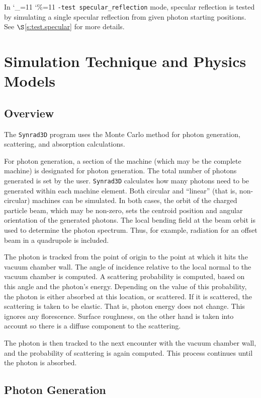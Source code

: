 \documentclass[11pt]{article}
\newcommand{\sref}[1]{$\S$\ref{#1}}
\newcommand{\srthree}{\texttt{Synrad3D}\xspace}
\newcommand\ttcmd{\begingroup\catcode`\_=11 \catcode`\%=11 \dottcmd}
\newcommand\dottcmd[1]{\texttt{#1}\endgroup}
\newcommand{\vn}{\ttcmd}
\begin{document}
In \vn{-test specular_reflection} mode, specular reflection is tested
by simulating a single specular reflection from given photon
starting positions. See \sref{s:test.specular} for more details.

\section{Simulation Technique and Physics Models}
\subsection{Overview} 

The \srthree program uses the Monte Carlo method for photon
generation, scattering, and absorption calculations.

For photon generation, a section of the machine (which may be the
complete machine) is designated for photon generation.  The total
number of photons generated is set by the user. \srthree calculates
how many photons need to be generated within each machine
element. Both circular and ``linear'' (that is, non-circular) machines
can be simulated.  In both cases, the orbit of the charged particle
beam, which may be non-zero, sets the centroid position and angular
orientation of the generated photons. The local bending field at the
beam orbit is used to determine the photon spectrum. Thus, for
example, radiation for an offset beam in a quadrupole is included.

The photon is tracked from the point of origin to
the point at which it hits the vacuum chamber wall. The angle of
incidence relative to the local normal to the vacuum chamber is
computed. A scattering probability is computed, based on this angle
and the photon's energy. Depending on the value of this probability,
the photon is either absorbed at this location, or scattered. If it is
scattered, the scattering is taken to be elastic. That is, photon
energy does not change. This ignores any florescence. Surface
roughness, on the other hand is taken into account so there is a
diffuse component to the scattering.

The photon is then tracked to the next encounter with the vacuum
chamber wall, and the probability of scattering is again
computed. This process continues until the photon is absorbed.

\subsection{Photon Generation}
\end{document}
